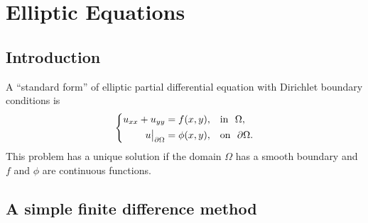 \section[Elliptic Equations]{Elliptic Equations}

\subsection{Introduction}

A ``standard form'' of elliptic partial differential equation with
Dirichlet boundary conditions is
%
\begin{equation}
  \left\{
    \begin{aligned}
      u_{xx} + u_{y y} & = f(x,y), & & {\rm in}~~\Omega,\\
      u\big |_{\partial\Omega} & = \phi(x,y), & & {\rm on}~~\partial\Omega.
    \end{aligned}
  \right.\label{dp}
\end{equation}
%
This problem has a unique solution if the domain $\Omega$ has a smooth
boundary and $f$ and $\phi$ are continuous functions.

\subsection{A simple finite difference method}

